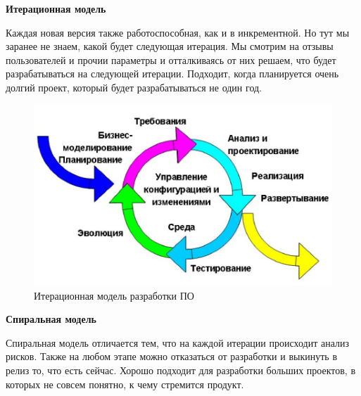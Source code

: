 \documentclass[bachelor, och, pract]{SCWorks}
\theoremstyle{remark}
\begin{document}
    \begin{center}
        \textbf{Итерационная модель}    
    \end{center}

    Каждая новая версия также работоспособная, как и в инкрементной. Но тут мы заранее не знаем, какой будет следующая итерация. Мы смотрим на отзывы пользователей и прочии параметры и отталкиваясь от них решаем, что будет разрабатываться на следующей итерации. Подходит, когда планируется очень долгий проект, который будет разрабатываться не один год.
    
    \begin{figure}[H]
        \begin{center}
            \includegraphics[scale=0.4]{res/iter-model.png}
            \caption{Итерационная модель разработки ПО}
        \end{center}
    \end{figure}

    
    \begin{center}
        \textbf{Спиральная модель}    
    \end{center}
    
    Спиральная модель отличается тем, что на каждой итерации происходит анализ рисков. Также на любом этапе можно отказаться от разработки и выкинуть в релиз то, что есть сейчас. Хорошо подходит для разработки больших проектов, в которых не совсем понятно, к чему стремится продукт.
\end{document}
